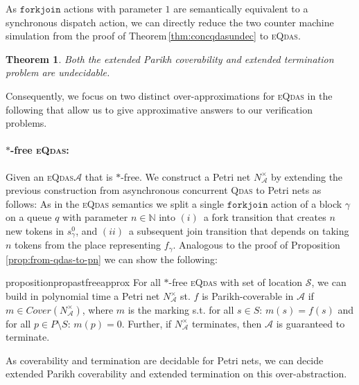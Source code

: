 \documentclass[runningheads,oribibl,]{article}
\newcommand{\Aa}{\ensuremath{\mathcal{A}}\xspace}
\newcommand{\Ss}{\ensuremath{\mathcal{S}}\xspace}
\newcommand{\NN}{\ensuremath{\mathbb{N}}\xspace}
\newcommand{\cfont}[1]{\ensuremath{\mathtt{#1}}\xspace}
\newcommand{\qdas}{\textsc{Qdas}\xspace}
\newcommand{\eqdas}{\textsc{eQdas}\xspace}
\newcommand{\Cover}{\ensuremath{\textit{Cover}}}
\newcommand{\forkjoin}{\ensuremath{\cfont{forkjoin}}\xspace}
\newtheorem{theorem}{Theorem}{}
\begin{document}
As \forkjoin actions with parameter $1$ are semantically
equivalent to a synchronous dispatch action, we can directly
reduce the two counter machine simulation from the proof of
Theorem\,\ref{thm:concqdasundec}  to \eqdas.

\begin{theorem}\label{thm:forkjoin_undec}
  Both  the extended Parikh coverability and extended termination problem are undecidable.
\end{theorem}

Consequently, we focus on two distinct over-approximations for \eqdas in
the following that allow us to give  approximative answers to our
verification problems.

\paragraph{\bf $\ast$-free \eqdas:}
Given an \eqdas $\Aa$ that is $\ast$-free. We construct
a Petri net $N_\Aa^\times$ by extending the previous
construction from asynchronous concurrent \qdas to Petri nets as
follows: As in the \eqdas semantics we split a single \forkjoin
action of a block $\gamma$ on a queue $q$ with parameter $n\in\NN$
into $(i)$~a fork transition that creates $n$ new tokens in
$s_\gamma^0$, and $(ii)$~a subsequent join transition that depends on
taking $n$ tokens from the place representing $f_\gamma$.
Analogous to the proof of Proposition\,\ref{prop:from-qdas-to-pn} we can show
the following:

\begin{restatable}{proposition}{propastfreeapprox}
  \label{prop:astfreeapprox}
  For all $\ast$-free \eqdas with set of location $\Ss$, we can build
  in polynomial time a Petri net $N_\Aa^\times$ st. $f$ is
  Parikh-coverable in $\Aa$ if $m\in\Cover(N_\Aa^\times)$, where $m$
  is the marking s.t. for all $s\in S$: $m(s)=f(s)$ and for all $p\in
  P\setminus S$: $m(p)=0$. Further, if
  $N_\Aa^\times$ terminates, then $\Aa$ is guaranteed to terminate.
\end{restatable}

As coverability and termination are decidable for Petri nets, we can
decide extended Parikh coverability and extended termination
on this over-abstraction.
\end{document}
